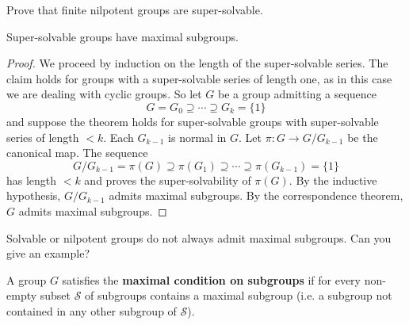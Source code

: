 
\begin{exercise}
\label{xca:nilpotent=>supersolvable}
Prove that finite nilpotent groups are super-solvable.
\end{exercise}


\begin{theorem}
Super-solvable groups have maximal subgroups. 	
\end{theorem}

\begin{proof} 
We proceed by induction on the length of the super-solvable series. The claim holds for groups with a super-solvable series of length one, as in this case we are dealing with cyclic groups. So let 
$G$ be a group admitting a sequence
	\[
		G=G_0\supseteq\cdots\supseteq G_k=\{1\}
	\]
and suppose the theorem holds for super-solvable groups
with super-solvable series of length $<k$. Each  
$G_{k-1}$ is normal in $G$. Let $\pi\colon G\to
	G/G_{k-1}$ be the canonical map. 
The sequence 
 	\[
		G/G_{k-1}=\pi(G)\supseteq \pi(G_1)\supseteq\cdots\supseteq\pi(G_{k-1})=\{1\}
	\]
has length 
$<k$ and proves the super-solvability of $\pi(G)$. By the inductive hypothesis, 
$G/G_{k-1}$ admits maximal subgroups. By the correspondence theorem, 
$G$ admits maximal subgroups. 
\end{proof}

Solvable or nilpotent groups do not always admit maximal subgroups. Can you give an example?

\begin{definition}
A group $G$ satisfies the \textbf{maximal condition on subgroups} if
for every non-empty subset $\mathcal{S}$ of subgroups contains a maximal 
subgroup (i.e. a subgroup not contained in any other subgroup of $\mathcal{S}$). 
\end{definition}


